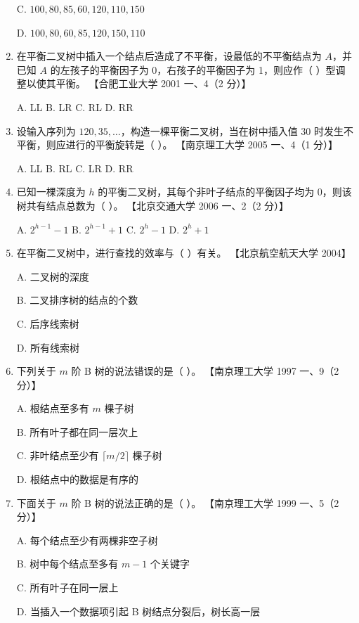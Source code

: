 \documentclass[lang=cn,newtx,10pt,scheme=chinese]{../../elegantbook}
\begin{document}
\begin{enumerate}
    C. $100, 80, 85, 60, 120, 110, 150$  

    D. $100, 80, 60, 85, 120, 150, 110$  

    \item 在平衡二叉树中插入一个结点后造成了不平衡，设最低的不平衡结点为 $A$，并已知 $A$ 的左孩子的平衡因子为 0，右孩子的平衡因子为 1，则应作（ ）型调整以使其平衡。  
    【合肥工业大学 2001 一、4（2 分）】  

    A. LL \quad B. LR \quad C. RL \quad D. RR  

    \item 设输入序列为 $120, 35, \dots$，构造一棵平衡二叉树，当在树中插入值 30 时发生不平衡，则应进行的平衡旋转是（ ）。  
    【南京理工大学 2005 一、4（1 分）】  

    A. LL \quad B. RL \quad C. LR \quad D. RR  

    \item 已知一棵深度为 $h$ 的平衡二叉树，其每个非叶子结点的平衡因子均为 0，则该树共有结点总数为（ ）。  
    【北京交通大学 2006 一、2（2 分）】  

    A. $2^{h-1} - 1$ \quad B. $2^{h-1} + 1$ \quad C. $2^{h} - 1$ \quad D. $2^{h} + 1$  

    \item 在平衡二叉树中，进行查找的效率与（ ）有关。  
    【北京航空航天大学 2004】  

    A. 二叉树的深度  

    B. 二叉排序树的结点的个数  

    C. 后序线索树  

    D. 所有线索树  

    \item 下列关于 $m$ 阶 B 树的说法错误的是（ ）。  
    【南京理工大学 1997 一、9（2 分）】  

    A. 根结点至多有 $m$ 棵子树  

    B. 所有叶子都在同一层次上  

    C. 非叶结点至少有 $\lceil m/2 \rceil$ 棵子树  

    D. 根结点中的数据是有序的  

    \item 下面关于 $m$ 阶 B 树的说法正确的是（ ）。  
    【南京理工大学 1999 一、5（2 分）】  

    A. 每个结点至少有两棵非空子树  

    B. 树中每个结点至多有 $m-1$ 个关键字  

    C. 所有叶子在同一层上  

    D. 当插入一个数据项引起 B 树结点分裂后，树长高一层  


\end{enumerate}
\end{document}
